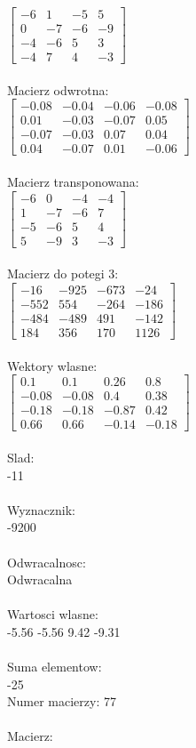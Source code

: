 \documentclass[a4paper,12pt]{article}
\begin{document}
$\begin{bmatrix} -6&1&-5&5\\0&-7&-6&-9\\-4&-6&5&3\\-4&7&4&-3 \end{bmatrix}$
\\
\\
Macierz odwrotna:\\

$\begin{bmatrix} -0.08&-0.04&-0.06&-0.08\\0.01&-0.03&-0.07&0.05\\-0.07&-0.03&0.07&0.04\\0.04&-0.07&0.01&-0.06 \end{bmatrix}$
\\
\\
Macierz transponowana:\\

$\begin{bmatrix} -6&0&-4&-4\\1&-7&-6&7\\-5&-6&5&4\\5&-9&3&-3 \end{bmatrix}$
\\
\\
Macierz do potegi 3:\\

$\begin{bmatrix} -16&-925&-673&-24\\-552&554&-264&-186\\-484&-489&491&-142\\184&356&170&1126 \end{bmatrix}$
\\
\\
Wektory wlasne:\\

$\begin{bmatrix} 0.1&0.1&0.26&0.8\\-0.08&-0.08&0.4&0.38\\-0.18&-0.18&-0.87&0.42\\0.66&0.66&-0.14&-0.18 \end{bmatrix}$
\\
\\
Slad:\\
-11
\\
\\
Wyznacznik:\\
-9200
\\
\\
Odwracalnosc:\\
Odwracalna
\\
\\
Wartosci wlasne:\\
-5.56 -5.56 9.42 -9.31
\\
\\
Suma elementow:\\
-25
\\
\newpage
Numer macierzy:
77
\\
\\
Macierz:\\
\end{document}
